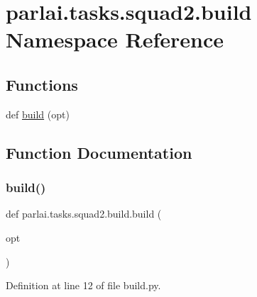 \hypertarget{namespaceparlai_1_1tasks_1_1squad2_1_1build}{}\section{parlai.\+tasks.\+squad2.\+build Namespace Reference}
\label{namespaceparlai_1_1tasks_1_1squad2_1_1build}
\subsection*{Functions}
\begin{DoxyCompactItemize}
\item 
def \hyperlink{namespaceparlai_1_1tasks_1_1squad2_1_1build_ac3bace71a0761323718dcde114b169d7}{build} (opt)
\end{DoxyCompactItemize}


\subsection{Function Documentation}
\mbox{\label{namespaceparlai_1_1tasks_1_1squad2_1_1build_ac3bace71a0761323718dcde114b169d7}} 
\subsubsection{\texorpdfstring{build()}{build()}}
{\footnotesize\ttfamily def parlai.\+tasks.\+squad2.\+build.\+build (\begin{DoxyParamCaption}\item[{}]{opt }\end{DoxyParamCaption})}



Definition at line 12 of file build.\+py.

